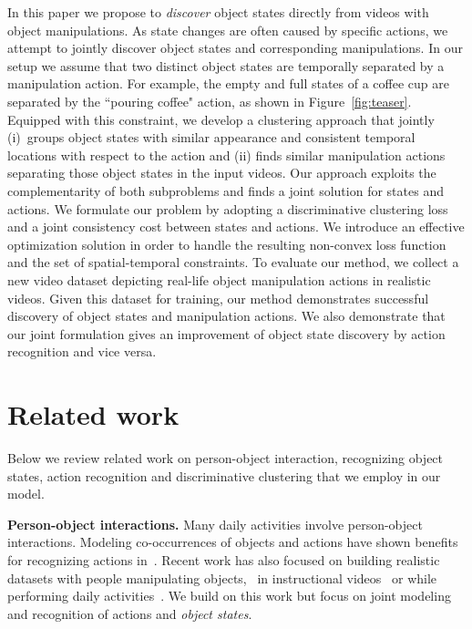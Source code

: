 In this paper we propose to {\em discover} object states directly from videos with object manipulations.
As state changes are often caused by specific actions, we attempt to jointly discover object states and corresponding manipulations.
%
%
%
%
%
%
%
%
%
%
%
In our setup we assume that two distinct object states are temporally separated by a manipulation action.
For example, the empty and full states of a coffee cup are separated by the ``pouring coffee" action, as shown in Figure~\ref{fig:teaser}.  
Equipped with this constraint, %
we develop a clustering approach that jointly (i)~groups object states with similar appearance and consistent temporal locations with respect to the action and (ii) finds similar manipulation actions separating those object states in the input videos.
Our approach exploits the complementarity of both subproblems and finds a joint solution for states and actions.
%
%
We formulate our problem by adopting a discriminative clustering loss~\cite{Bach07diffrac} and a joint consistency cost between states and actions.  
We introduce an effective optimization solution in order to handle the resulting non-convex loss function and the set of spatial-temporal constraints.
To evaluate our method, we collect a new video dataset depicting real-life object manipulation actions in realistic videos.
Given this dataset for training, our method demonstrates successful discovery of object states and manipulation actions.
We also demonstrate that our joint formulation gives an improvement of object state discovery by action recognition and vice versa.


\section{Related work}
\label{sec:rel_work}

Below we review related work on person-object interaction, recognizing object states, action recognition and discriminative clustering that we employ in our model. 

\noindent\textbf{Person-object interactions.}
Many daily activities involve person-object interactions. %
Modeling co-occurrences of objects and actions have shown benefits for recognizing actions in~\cite{delaitre11personaction,gupta2009observing,kjellstrom2011visual,pirsiavash2012detecting,yao2011human}.
Recent work has also focused on building realistic datasets with people manipulating objects, \eg~in instructional videos~\cite{Alayrac15Unsupervised,Malmaud15what,Sener15unsupervised} or while performing daily activities~\cite{varol16hollywood}.
We build on this work but focus on joint modeling and recognition of actions and {\em object states}.

